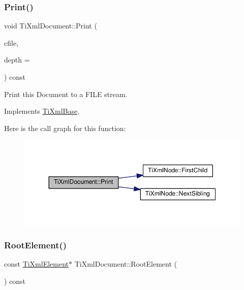 \subsubsection{\texorpdfstring{Print()}{Print()}\hspace{0.1cm}{\footnotesize\ttfamily [2/2]}}
{\footnotesize\ttfamily void Ti\+Xml\+Document\+::\+Print (\begin{DoxyParamCaption}\item[{F\+I\+LE $\ast$}]{cfile,  }\item[{int}]{depth = {} }\end{DoxyParamCaption}) const\hspace{0.3cm}{\ttfamily [virtual]}}



Print this Document to a F\+I\+LE stream. 



Implements \hyperlink{class_ti_xml_base_a0de56b3f2ef14c65091a3b916437b512}{Ti\+Xml\+Base}.

Here is the call graph for this function\+:\nopagebreak
\begin{figure}[H]
\begin{center}
\leavevmode
\includegraphics[width=350pt]{class_ti_xml_document_aa9e166fae51da603641380a964f21eeb_cgraph}
\end{center}
\end{figure}
\mbox{\label{class_ti_xml_document_ab54e3a93279fcf0ac80f06ed9c52f04a}} 
\subsubsection{\texorpdfstring{Root\+Element()}{RootElement()}\hspace{0.1cm}{\footnotesize\ttfamily [1/2]}}
{\footnotesize\ttfamily const \hyperlink{class_ti_xml_element}{Ti\+Xml\+Element}$\ast$ Ti\+Xml\+Document\+::\+Root\+Element (\begin{DoxyParamCaption}{ }\end{DoxyParamCaption}) const\hspace{0.3cm}{\ttfamily [inline]}}

